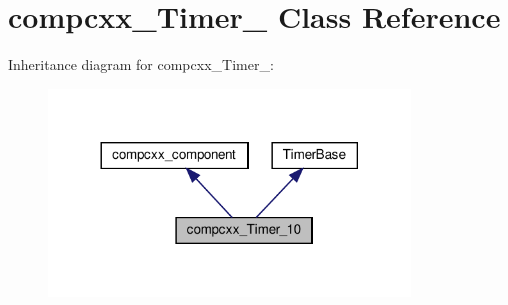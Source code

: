 \hypertarget{classcompcxx__Timer__10}{}\section{compcxx\+\_\+\+Timer\+\_ Class Reference}
\label{classcompcxx__Timer__10}


Inheritance diagram for compcxx\+\_\+\+Timer\+\_\+:\nopagebreak
\begin{figure}[H]
\begin{center}
\leavevmode
\includegraphics[width=272pt]{classcompcxx__Timer__10__inherit__graph}
\end{center}
\end{figure}


